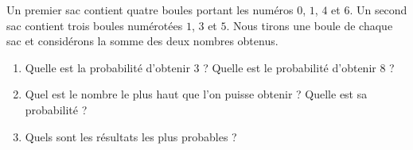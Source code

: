 
\begin{exercice}\label{exosmath-0282}

    Un premier sac contient quatre boules portant les numéros \( 0\), \( 1\), \( 4\) et \( 6\). Un second sac contient trois boules numérotées \( 1\), \( 3\) et \( 5\). Nous tirons une boule de chaque sac et considérons la somme des deux nombres obtenus.
    \begin{enumerate}
        \item
            Quelle est la probabilité d'obtenir \( 3\) ? Quelle est le probabilité d'obtenir \( 8\) ?
        \item
            Quel est le nombre le plus haut que l'on puisse obtenir ? Quelle est sa probabilité ?
        \item
            Quels sont les résultats les plus probables ?
    \end{enumerate}

\end{exercice}
